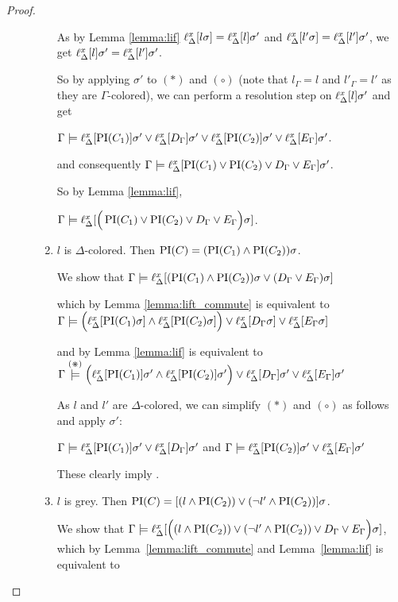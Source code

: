 \documentclass[,%
	paper=a4,%
	DIV14, 
	liststotoc,
	bibtotoc,
	draft=false,%
	numbers=noendperiod
]{scrartcl}
\newcommand{\lif}[1]{\lift{\Delta}{#1}{x}}
\begin{document}
\begin{proof}
\begin{description}
\begin{enumerate}
					As by Lemma \ref{lemma:lif} $\lif{l\sigma} = \lif{l}\sigma'$ and $\lif{l'\sigma} = \lif{l'}\sigma'$,
					we get $\lif{l}\sigma' = \lif{l'}\sigma'$.\label{aou5jklah}

					So by applying $\sigma'$ to $(*)$ and $(\circ)$ (note that $l_\Gamma = l$ and $l'_\Gamma = l'$ as they are $\Gamma$-colored), we can perform a resolution step on $\lif{l}\sigma'$ and get

					$\Gamma \entails \lif{\PI(C_1)}\sigma' \lor \lif{D_\Gamma} \sigma' \lor \lif{\PI(C_2)}\sigma' \lor \lif {E_\Gamma} \sigma'$.

					and consequently
				$\Gamma \entails \lif{ \PI(C_1) \lor \PI(C_2) \lor D_\Gamma \lor E_\Gamma}\sigma' $.

				So by Lemma \ref{lemma:lif},

				$\Gamma \entails \lif{ \Big(\PI(C_1) \lor \PI(C_2) \lor D_\Gamma \lor E_\Gamma \Big) \sigma } $.


				\item $l$ is $\Delta$-colored.
					Then $\operatorname{PI}(C) = (\operatorname{PI}(C_1) \land \operatorname{PI}(C_2))\sigma$. 

					We show that $\Gamma \entails \lif{(\PI(C_1) \land \PI(C_2))\sigma \lor (D_\Gamma \lor E_\Gamma)\sigma}$

					which by Lemma \ref{lemma:lift_commute} is equivalent to\newline
					$\Gamma \entails \Big(\lif{\PI(C_1)\sigma} \land \lif{\PI(C_2)\sigma}\Big) \lor \lif{D_\Gamma\sigma} \lor \lif{E_\Gamma\sigma}$

					and by Lemma \ref{lemma:lif} is equivalent to\newline
					$\Gamma \stackrel{\markC}\entails \Big(\lif{\PI(C_1)}\sigma' \land \lif{\PI(C_2)}\sigma'\Big) \lor \lif{D_\Gamma}\sigma' \lor \lif{E_\Gamma}\sigma'$

					As $l$ and $l'$ are $\Delta$-colored, we can simplify $(*)$ and $(\circ)$ as follows and apply $\sigma'$:

					$\Gamma \entails \lif{\PI(C_1)}\sigma' \lor \lif{D_\Gamma}\sigma' $ and $\Gamma \entails \lif{\PI(C_2)}\sigma' \lor \lif{E_\Gamma}\sigma'$

					These clearly imply \markC.

				\item $l$ is grey. Then $\operatorname{PI}(C) = [(l \land \operatorname{PI}(C_2) ) \lor (\lnot l' \land \operatorname{PI}(C_2))]\sigma$.

					We show that $\Gamma \entails \lif{ \Big((l \land \PI(C_2) ) \lor (\lnot l' \land \PI(C_2)) \lor D_\Gamma \lor E_\Gamma\Big)\sigma}$, which by Lemma~\ref{lemma:lift_commute} and Lemma~\ref{lemma:lif} is equivalent to


\end{enumerate}
\end{description}
\end{proof}
\end{document}
